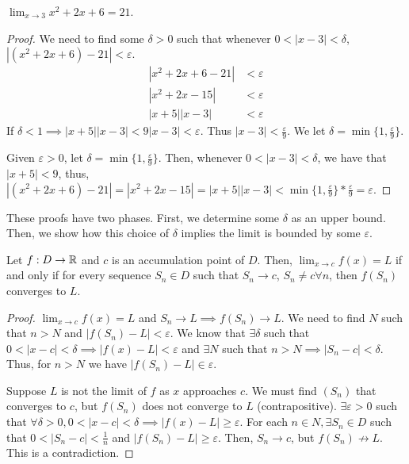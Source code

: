\begin{theorem}
    $\lim_{x \to 3} x^2 + 2x + 6 = 21$.
\end{theorem}
\begin{proof}
    We need to find some $\delta > 0$ such that whenever $0 < |x - 3| < \delta$, $|(x^2 + 2x + 6) - 21| < \varepsilon$.
    \begin{align*}
        |x^2 + 2x + 6 - 21| &< \varepsilon \\
        |x^2 + 2x - 15| &< \varepsilon \\
        |x + 5||x - 3| &< \varepsilon
    \end{align*}
    If $\delta < 1 \implies |x + 5||x - 3| < 9|x - 3| < \varepsilon$. Thus $|x - 3| < \frac{\varepsilon}{9}$. We let $\delta = \min\{1, \frac{\varepsilon}{9}\}$.

    Given $\varepsilon > 0$, let $\delta = \min\{1, \frac{\varepsilon}{9}\}$. Then, whenever $0 < |x - 3| < \delta$, we have that $|x + 5| < 9$, thus, $|(x^2 + 2x + 6) - 21| = |x^2 + 2x - 15| = |x + 5||x - 3| < \min\{1, \frac{\varepsilon}{9}\} * \frac{\varepsilon}{9} = \varepsilon$.
\end{proof}
\begin{remark}
    These proofs have two phases. First, we determine some $\delta$ as an upper bound. Then, we show how this choice of $\delta$ implies the limit is bounded by some $\varepsilon$.
\end{remark}

\begin{theorem}
    Let $f:D \to \mathbb{R}$ and $c$ is an accumulation point of $D$. Then, $\lim_{x \to c} f(x) = L$ if and only if for every sequence $S_n \in D$ such that $S_n \to c$, $S_n \neq c \forall n$, then $f(S_n)$ converges to $L$.
\end{theorem}
\begin{proof}
    $\lim_{x \to c} f(x) = L$ and $S_n \to L \implies f(S_n) \to L$. We need to find $N$ such that $n > N$ and $|f(S_n) - L| < \varepsilon$. We know that $\exists \delta$ such that $0 < |x - c| < \delta \implies |f(x) - L| < \varepsilon$ and $\exists N$ such that $n > N \implies |S_n - c| < \delta$. Thus, for $n > N$ we have $|f(S_n) - L| \in \varepsilon$.

    Suppose $L$ is not the limit of $f$ as $x$ approaches $c$. We must find $(S_n)$ that converges to $c$, but $f(S_n)$ does not converge to $L$ (contrapositive). $\exists \varepsilon > 0$ such that $\forall \delta > 0, 0 < |x - c| < \delta \implies |f(x) - L| \geq \varepsilon$. For each $n \in N, \exists S_n \in D$ such that $0 < |S_n - c| < \frac{1}{n}$ and $|f(S_n) - L| \geq \varepsilon$. Then, $S_n \to c$, but $f(S_n) \not\to L$. This is a contradiction.
\end{proof}